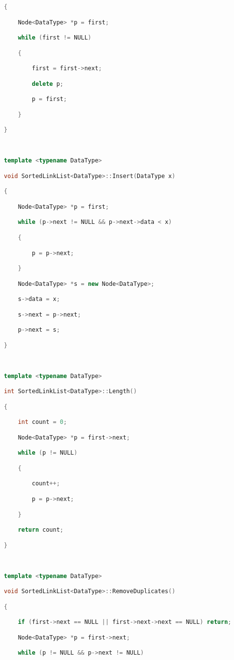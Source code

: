 \begin{lstlisting}[language=C++]
{

    Node<DataType> *p = first;

    while (first != NULL)

    {  

        first = first->next;

        delete p;

        p = first;

    }

}

  

template <typename DataType>

void SortedLinkList<DataType>::Insert(DataType x)

{

    Node<DataType> *p = first;

    while (p->next != NULL && p->next->data < x)

    {

        p = p->next;

    }

    Node<DataType> *s = new Node<DataType>;

    s->data = x;

    s->next = p->next;

    p->next = s;

}

  

template <typename DataType>

int SortedLinkList<DataType>::Length()

{

    int count = 0;

    Node<DataType> *p = first->next;

    while (p != NULL)

    {

        count++;

        p = p->next;

    }

    return count;

}

  

template <typename DataType>

void SortedLinkList<DataType>::RemoveDuplicates()

{

    if (first->next == NULL || first->next->next == NULL) return;

    Node<DataType> *p = first->next;

    while (p != NULL && p->next != NULL)


\end{lstlisting}
